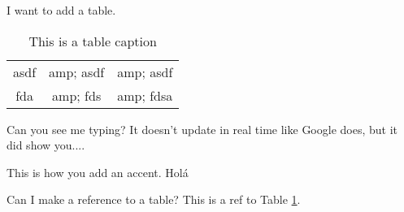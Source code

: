 
I want to add a table.
\begin{table} 
    \begin{tabular}{ c c c }
        asdf &amp; asdf &amp; asdf \\ 
        fda &amp; fds &amp; fdsa \\ 
    \end{tabular} 
    \caption{This is a table caption} 
    \label{tab:test_table_1}
\end{table}

Can you see me typing? It doesn't update in real time like Google does, but it did show you....

This is how you add an accent. Holá

Can I make a reference to a table? This is a ref to Table \ref{tab:test_table_1}.
